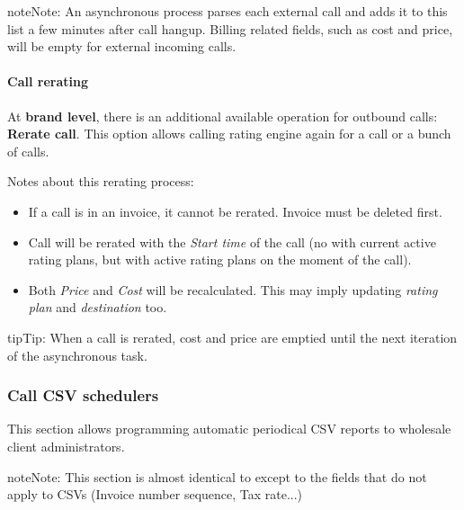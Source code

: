 \documentclass[letterpaper,10pt,english]{sphinxmanual}
\begin{document}
\begin{notice}{note}{Note:}
An asynchronous process parses each external call and adds it to this list a few minutes after call hangup. Billing related fields, such as cost and price, will be empty for external incoming calls.
\end{notice}


\paragraph{Call rerating}
\label{administration_portal/client/wholesale/calls/external_calls:call-rerating}
At \textbf{brand level}, there is an additional available operation for outbound calls: \textbf{Rerate call}. This option allows calling rating engine again for a call or a bunch of calls.

Notes about this rerating process:
\begin{itemize}
\item {} 
If a call is in an invoice, it cannot be rerated. Invoice must be deleted first.

\item {} 
Call will be rerated with the \emph{Start time} of the call (no with current active rating plans, but with active rating plans
on the moment of the call).

\item {} 
Both \emph{Price} and \emph{Cost} will be recalculated. This may imply updating \emph{rating plan} and \emph{destination} too.

\end{itemize}

\begin{notice}{tip}{Tip:}
When a call is rerated, cost and price are emptied until the next iteration of the asynchronous task.
\end{notice}


\subsubsection{Call CSV schedulers}
\label{administration_portal/client/wholesale/calls/call_csv_schedulers:call-csv-schedulers}\label{administration_portal/client/wholesale/calls/call_csv_schedulers::doc}
This section allows programming automatic periodical CSV reports to wholesale client administrators.

\begin{notice}{note}{Note:}
This section is almost identical to {\hyperref[administration_portal/brand/invoicing/invoice_schedulers:invoice\string-schedulers]{}} except to the
fields that do not apply to CSVs (Invoice number sequence, Tax rate...)
\end{notice}
\end{document}
